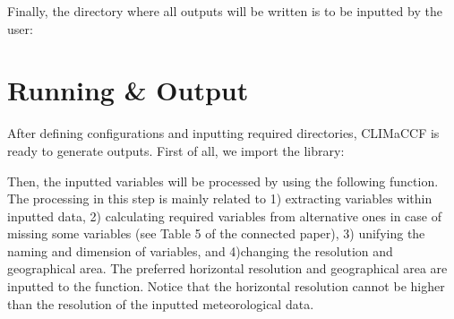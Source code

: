 \documentclass[a4paper,11pt,english]{sphinxmanual}
\begin{document}
\begin{sphinxVerbatim}[commandchars=\\\{\}]
 \PYG{p}{[}\PYG{p}{]}        
\end{sphinxVerbatim}

\sphinxAtStartPar
Finally, the directory where all outputs will be written is to be inputted by the user:

\begin{sphinxVerbatim}[commandchars=\\\{\}]
      
\end{sphinxVerbatim}


\section{Running \& Output}
\label{\detokenize{gStarted:running-output}}
\sphinxAtStartPar
After defining configurations and inputting required directories, CLIMaCCF is ready to generate outputs. First of all, we import the library:

\begin{sphinxVerbatim}[commandchars=\\\{\}]
 
   
\end{sphinxVerbatim}

\sphinxAtStartPar
Then, the inputted variables will be processed by using the following function. The processing in this step is mainly related to 1) extracting variables within inputted data, 2) calculating required variables from alternative ones in case of missing some variables (see Table 5 of the connected paper), 3) unifying the naming and dimension of variables, and 4)changing the resolution and geographical area.
The preferred horizontal resolution and geographical area are inputted to the function. Notice that the horizontal resolution cannot be higher than the resolution of the inputted meteorological data.

\begin{sphinxVerbatim}[commandchars=\\\{\}]
        
\end{sphinxVerbatim}
\end{document}
